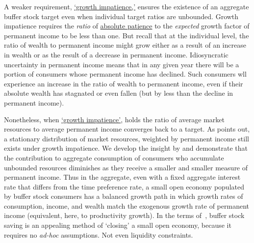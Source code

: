 \documentclass[BufferStockTheory]{subfiles}
\begin{document}
%

A weaker requirement, \hyperlink{GIC}{`growth impatience,'} ensures the existence of an aggregate buffer stock target even when individual target ratios are unbounded. %
Growth impatience requires the \textit{ratio} of \hyperlink{APFacDefn}{absolute patience} to the \textit{expected} growth factor of permanent income to be less than one.  But recall that at the individual level, the ratio of wealth to permanent income might grow either as a result of an increase in wealth or as the result of a decrease in permanent income.  Idiosyncratic uncertainty in permanent income means that in any given year there will be a portion of consumers whose permanent income has declined.  Such consumers wll experience an increase  in the ratio of wealth to permanent income, even if their absolute wealth has stagnated or even fallen (but by less than the decline in permanent income).

Nonetheless, when \hyperlink{GIC}{`growth impatience'}, holds the ratio of average market resources to average permanent income converges back to a target. As \cite{harmenbergInvariant} points out, a stationary distribution of market resources, weighted by permanent income still exists under growth impatience. We develop the insight by \cite{harmenbergInvariant} and demonstrate that the contribution to aggregate consumption of consumers who accumulate unbounded resources diminishes as they receive a smaller and smaller measure of permanent income. Thus in the aggregate, even with a fixed aggregate interest rate that differs from the time preference rate, a small open economy populated by buffer stock consumers has a balanced growth path in which growth rates of consumption, income, and wealth match the exogenous growth rate of permanent income (equivalent, here, to productivity growth). In the terms of~\cite{schmitt2003closing}, buffer stock saving is an appealing method of `closing' a small open economy, because it requires no \textit{ad-hoc} assumptions.  Not even liquidity constraints.

\begin{comment}
\footnote{The paper's insights are instantiated in the {\ARKurl} toolkit, whose \href{https://hark.readthedocs.io/en/stable/reference/ConsumptionSaving/ConsIndShockModel.html}{buffer stock saving module} flags parametric choices under which a problem is degenerate or under which stable ratios of wealth to income may not exist.}
\end{comment}
\end{document}
